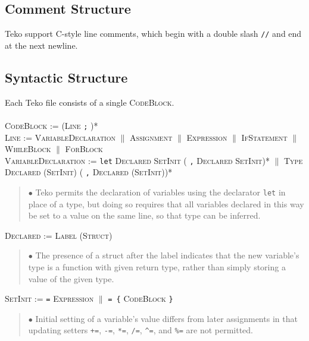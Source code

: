\documentclass{article}
\newcommand{\code}[1]{\colorbox{light-gray}{\texttt{#1}}}
\begin{document}
\subsection{Comment Structure}

Teko support C-style line comments, which begin with a double slash \code{//} and end at the next newline. \\

\subsection{Syntactic Structure}

Each Teko file consists of a single \textsc{CodeBlock}. \\ \\

\textsc{CodeBlock} := (\textsc{Line} \code{;} )* \\

\textsc{Line} := \textsc{VariableDeclaration} $\|$ \textsc{Assignment} $\|$ \textsc{Expression} $\|$ \textsc{IfStatement} $\|$ \textsc{WhileBlock} $\|$ \textsc{ForBlock} \\

\textsc{VariableDeclaration} := \code{let} \textsc{Declared} \textsc{SetInit} ( \code{,} \textsc{Declared} \textsc{SetInit})* $\|$ \textsc{Type} \textsc{Declared} (\textsc{SetInit}) ( \code{,} \textsc{Declared} (\textsc{SetInit}))* 

\begin{quote} $\bullet$ Teko permits the declaration of variables using the declarator \code{let} in place of a type, but doing so requires that all variables declared in this way be set to a value on the same line, so that type can be inferred. \end{quote}

\textsc{Declared} := \textsc{Label} (\textsc{Struct}) 

\begin{quote} $\bullet$ The presence of a struct after the label indicates that the new variable's type is a function with given return type, rather than simply storing a value of the given type. \end{quote}

\textsc{SetInit} := \code{=} \textsc{Expression} $\|$ \code{= \{} \textsc{CodeBlock} \code{\}} 

\begin{quote} $\bullet$ Initial setting of a variable's value differs from later assignments in that updating setters \code{+=}, \code{-=}, \code{*=}, \code{/=}, \code{\^{}=}, and \code{\%=} are not permitted. \end{quote}
\end{document}
